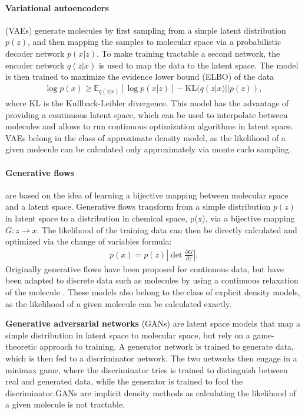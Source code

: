 \paragraph{Variational autoencoders} (VAEs) \citep{kingmaAutoEncodingVariationalBayes2013} generate molecules by first
sampling from a simple latent distribution $p(z)$, and then mapping the samples to molecular space
via a probabilistic decoder network $p(x|z)$. To make training tractable a second network, the
encoder network $q(z|x)$ is used to map the data to the latent space. The model is then trained to
maximize the evidence lower bound (ELBO) of the data
\begin{align}
      \log p(x) \geq \mathbb{E}_{q(z|x)}[\log p(x|z)] - \text{KL}(q(z|x) || p(z)),
\end{align}
where KL is the Kullback-Leibler divergence. This model has the advantage of providing a continuous
latent space, which can be used to interpolate between molecules and allows to run continuous
optimization algorithms in latent space. VAEs belong in the class of approximate density model, as
the likelihood of a given molecule can be calculated only approximately via monte carlo sampling.

\paragraph{Generative flows} \citep{rezendeVariationalInferenceNormalizing2016} are based on the idea of learning a bijective mapping between molecular
space and a latent space. Generative flows transform from a simple distribution $p(z)$ in latent space
to a distribution in chemical space, p(x), via a bijective mapping $G: z \rightarrow x$.
The likelihood of the training data can then be directly calculated and optimized
via the change of variables formula:
\begin{align}
      p(x) = p(z) \left| \det \frac{\partial G}{\partial z} \right|.
\end{align}
Originally generative flows have been proposed for continuous data, but have been adapted to
discrete data such as molecules by using a continuous relaxation of the molecule
\citep{madhawaGraphNVPInvertibleFlow2019}. These models also belong to the class of explicit density
models, as the likelihood of a given molecule can be calculated exactly.

\textbf{Generative adversarial networks} (GANs) \citep{goodfellowGenerativeAdversarialNetworks2014}
are latent space models that map a simple distribution in latent space to molecular space, but rely
on a game-theoretic approach to training. A generator network is trained to generate data, which is
then fed to a discriminator network. The two networks then engage in a minimax game, where the
discriminator tries is trained to distinguish between real and generated data, while the generator
is trained to fool the discriminator.\@ \acp{GAN} are implicit density methods as calculating the
likelihood of a given molecule is not tractable.


